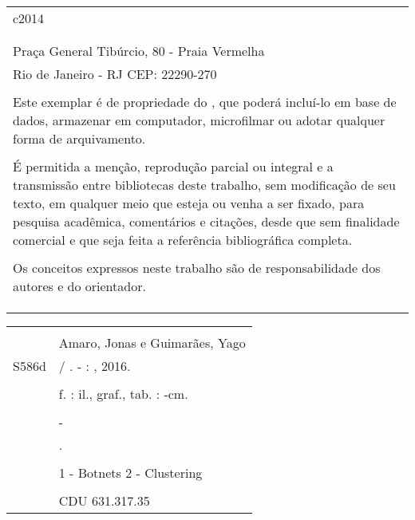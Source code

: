 \begin{fichacatalografica}
	\begin{tabular}{@{\hspace{0cm}}p{14.8cm}}
	c2014\\
	\\
	\imprimirinstituicao\\
	Praça General Tibúrcio, 80 - Praia Vermelha\\
	Rio de Janeiro - RJ \hspace{1.5cm} CEP: 22290-270\\
	\\
	Este exemplar é de propriedade do \imprimirinstituicao, que poderá incluí-lo em base de dados, armazenar em computador, microfilmar ou adotar qualquer forma de arquivamento.\\
	\\
	É permitida a menção, reprodução parcial ou integral e a transmissão entre bibliotecas deste trabalho, sem modificação de seu texto, em qualquer meio que esteja ou venha a ser fixado, para pesquisa acadêmica, comentários e citações, desde que sem finalidade comercial e que seja feita a referência bibliográfica completa.\\
	\\
	Os conceitos expressos neste trabalho são de responsabilidade dos autores e do orientador.\\
	\\
	\\
	\\
	\end{tabular}

	\small
	\begin{center}
	\begin{tabular}{|cp{13cm}|} \hline
		\hspace{1.3cm} & \\
		& Amaro, Jonas e Guimarães, Yago \\
		\hspace{0.2cm} S586d & \hspace{0.3cm} \imprimirtitulo{} / \imprimirautor. - \imprimirlocal: \imprimirinstituicao, 2016. \\
		& \\
		& \hspace{0.65cm} \pageref{LastPage}f. : il., graf., tab. : -cm. \\
		& \\
		& \hspace{0.6cm} \imprimirtipotrabalho{} - \imprimirinstituicao \\
		& \hspace{0.6cm} \imprimirorientadorRotulo{} \imprimirorientador.\\
		& \\
		& \hspace{0.6cm} 1 - Botnets \hspace{0.1cm} 2 - Clustering\\
		
		& \\ 
		& \hspace{9.75cm} CDU 631.317.35 \\
		\hline
	\end{tabular}
	\end{center}
\end{fichacatalografica}